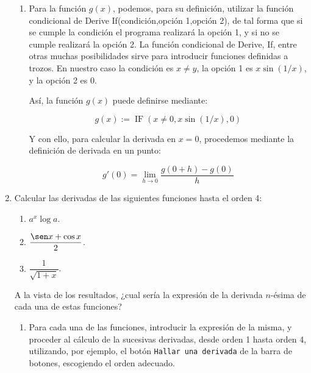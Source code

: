 \begin{enumerate}[leftmargin=*]
\begin{indicacion}
{\begin{enumerate}
\[
f'(1) = \mathop {\lim }\limits_{h \to 0} \frac{{f(1 + h) - f(1)}}
{h}
\]

\item Para la función $g(x)$, podemos, para su definición,
utilizar la función condicional de Derive
\textsf{If(condición,opción 1,opción 2)}, de tal forma que si se
cumple la \textsf{condición} el programa realizará la
\textsf{opción 1}, y si no se cumple realizará la \textsf{opción
2}. La función condicional de Derive, \textsf{If}, entre otras
muchas posibilidades sirve para introducir funciones definidas a
trozos. En nuestro caso la \textsf{condición} es $x\neq y$, la
\textsf{opción 1} es $x\sin(1/x)$, y la \textsf{opción 2} es $0$.

Así, la función $g(x)$ puede definirse mediante:

\[
g(x):=\operatorname{IF}(x\neq0,x\sin(1/x),0)
\]


Y con ello, para calcular la derivada en $x=0$, procedemos
mediante la definición de derivada en un punto:


\[
g'(0) = \mathop {\lim }\limits_{h \to 0} \frac{{g(0 + h) - g(0)}}
{h} 
\]



\end{enumerate}
}
\end{indicacion}


\item  Calcular las derivadas de las siguientes funciones hasta el
orden 4:

\begin{enumerate}
\item  $a^x\log a$.

\item  $\dfrac{\sen x +\cos x}{2}$.

\item  $\dfrac{1}{\sqrt{1+x}}$.
\end{enumerate}

A la vista de los resultados, ¿cual sería la expresión de la
derivada $n$-ésima de cada una de estas funciones?

\begin{indicacion}
{
\begin{enumerate}
\item Para cada una de las funciones, introducir la expresión de
la misma, y proceder al cálculo de la sucesivas derivadas, desde
orden 1 hasta orden 4, utilizando, por ejemplo, el botón
\texttt{Hallar una derivada} de la barra de botones, escogiendo el
orden adecuado.


\end{enumerate}}
\end{indicacion}
\end{enumerate}
